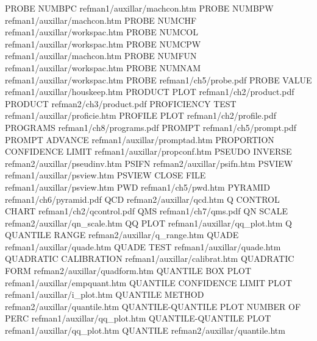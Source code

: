 PROBE NUMBPC                            refman1/auxillar/machcon.htm
PROBE NUMBPW                            refman1/auxillar/machcon.htm
PROBE NUMCHF                            refman1/auxillar/workspac.htm
PROBE NUMCOL                            refman1/auxillar/workspac.htm
PROBE NUMCPW                            refman1/auxillar/machcon.htm
PROBE NUMFUN                            refman1/auxillar/workspac.htm
PROBE NUMNAM                            refman1/auxillar/workspac.htm
PROBE                                   refman1/ch5/probe.pdf
PROBE VALUE                             refman1/auxillar/houskeep.htm
PRODUCT PLOT                            refman1/ch2/product.pdf
PRODUCT                                 refman2/ch3/product.pdf
PROFICIENCY TEST                        refman1/auxillar/proficie.htm
PROFILE PLOT                            refman1/ch2/profile.pdf
PROGRAMS                                refman1/ch8/programs.pdf
PROMPT                                  refman1/ch5/prompt.pdf
PROMPT ADVANCE                          refman1/auxillar/promptad.htm
PROPORTION CONFIDENCE LIMIT             refman1/auxillar/propconf.htm
PSEUDO INVERSE                          refman2/auxillar/pseudinv.htm
PSIFN                                   refman2/auxillar/psifn.htm
PSVIEW                                  refman1/auxillar/psview.htm
PSVIEW CLOSE FILE                       refman1/auxillar/psview.htm
PWD                                     refman1/ch5/pwd.htm
PYRAMID                                 refman1/ch6/pyramid.pdf
QCD                                     refman2/auxillar/qcd.htm
Q CONTROL CHART                         refman1/ch2/qcontrol.pdf
QMS                                     refman1/ch7/qms.pdf
QN SCALE                                refman2/auxillar/qn_scale.htm
QQ PLOT                                 refman1/auxillar/qq_plot.htm
Q QUANTILE RANGE                        refman2/auxillar/q_range.htm
QUADE                                   refman1/auxillar/quade.htm
QUADE TEST                              refman1/auxillar/quade.htm
QUADRATIC CALIBRATION                   refman1/auxillar/calibrat.htm
QUADRATIC FORM                          refman2/auxillar/quadform.htm
QUANTILE BOX PLOT                       refman1/auxillar/empquant.htm
QUANTILE CONFIDENCE LIMIT PLOT          refman1/auxillar/i_plot.htm
QUANTILE METHOD                         refman2/auxillar/quantile.htm
QUANTILE-QUANTILE PLOT NUMBER OF PERC   refman1/auxillar/qq_plot.htm
QUANTILE-QUANTILE PLOT                  refman1/auxillar/qq_plot.htm
QUANTILE                                refman2/auxillar/quantile.htm
